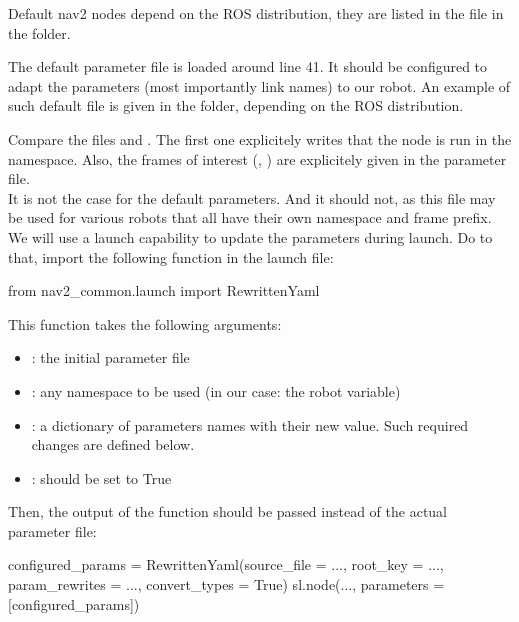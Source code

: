 \documentclass{ecnreport}
\begin{document}
Default nav2 nodes depend on the ROS distribution, they are listed in the file  in the  folder.

The default parameter file is loaded around line 41. It should be configured to adapt the parameters (most importantly link names) to our robot. An example of such default file is given in the  folder, depending on the ROS distribution.

Compare the files  and . The first one explicitely writes that the node is run in the  namespace. Also, the frames of interest (, ) are explicitely given in the parameter file.\\

It is not the case for the default parameters. And it should not, as this file may be used for various robots that all have their own namespace and frame prefix.\\
We will use a launch capability to update the parameters during launch. Do to that, import the following function in the launch file:
\begin{pythoncodelarge}
from nav2_common.launch import RewrittenYaml
\end{pythoncodelarge}

This function takes the following arguments:
\begin{itemize}
\item {}: the initial parameter file
\item {}: any namespace to be used (in our case: the robot variable)
\item {}: a dictionary of parameters names with their new value. Such required changes are defined below.
\item {}: should be set to True
\end{itemize}

Then, the output of the function should be passed instead of the actual parameter file:
\begin{pythoncodelarge}
configured_params = RewrittenYaml(source_file = ...,
                                    root_key = ..., 
                                    param_rewrites = ...,
                                    convert_types = True)
sl.node(..., parameters = [configured_params])
\end{pythoncodelarge}
\end{document}
